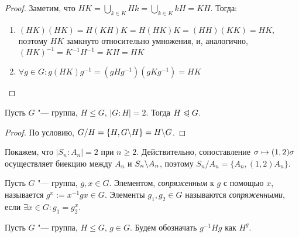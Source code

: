 \begin{proof}
	Заметим, что $HK = \bigcup\limits_{k \in K}Hk = \bigcup\limits_{k \in K}kH = KH$. Тогда:
	\begin{enumerate}
		\item $(HK)(HK) = H(KH)K = H(HK)K = (HH)(KK) = HK$, поэтому $HK$ замкнуто относительно умножения, и, аналогично, $(HK)^{-1} = K^{-1}H^{-1} = KH = HK$
		\item $\forall g \in G: g(HK)g^{-1} = (gHg^{-1})(gKg^{-1}) = HK$
	\end{enumerate}
\end{proof}

\begin{proposition}
	Пусть $G$ "--- группа, $H \le G$, $|G : H| = 2$. Тогда $H \trianglelefteqslant G$.
\end{proposition}

\begin{proof}
	По условию, $G / H = \{H, G \backslash H\} = H \backslash G$.
\end{proof}

\begin{note}
	Покажем, что $|S_n : A_n| = 2$ при $n \ge 2$. Действительно, сопоставление $\sigma \hm\mapsto (1, 2)\sigma$ осуществляет биекцию между $A_n$ и $S_n \backslash A_n$, поэтому $S_n / A_n = \{A_n, (1, 2)A_n\}$.
\end{note}

\begin{definition}
	Пусть $G$ "--- группа, $g, x \in G$. Элементом, \textit{сопряженным} к $g$ с помощью $x$, называется $g^x := x^{-1}gx \in G$. Элементы $g_1, g_2 \in G$ называются \textit{сопряженными}, если $\exists x \in G: g_1 = g_2^x$.
\end{definition}

\begin{note}
	Пусть $G$ "--- группа, $H \le G$, $g \in G$. Будем обозначать $g^{-1}Hg$ как $H^g$.
\end{note}